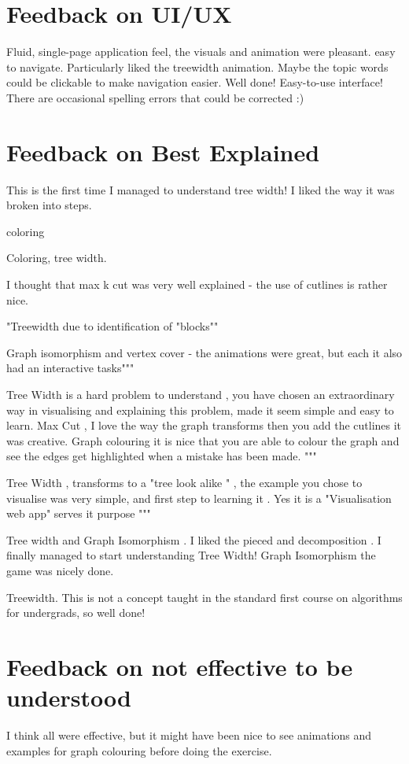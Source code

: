 \section{Feedback on UI/UX}
Fluid, single-page application feel, 
the visuals and animation were pleasant. easy to navigate.
Particularly liked the treewidth animation.
Maybe the topic words could be clickable to make navigation easier.
Well done! Easy-to-use interface! There are occasional spelling errors that
   could be corrected :)



\section{Feedback on Best Explained}
This is the first time I managed to understand tree width! I liked the
way it was broken into steps.

coloring

Coloring, tree width.

I thought that max k cut was very well explained - the use of cutlines is rather nice.

"Treewidth due to identification of "blocks""

Graph isomorphism and vertex cover - the animations were great, but
each it also had an interactive tasks"""

Tree Width is a hard problem to understand , you
have chosen an extraordinary way in visualising and explaining this
problem, made it seem simple and easy to learn. 
Max Cut , I love the way
the graph transforms then you add the cutlines it was creative. Graph
colouring it is nice that you are able to colour the graph and see the
edges get highlighted when a mistake has been made.  """

Tree Width ,
transforms to a "tree look alike " , the example you chose to visualise
was very simple, and first step to learning it . Yes it is a
"Visualisation web app" serves it purpose """

Tree width and Graph Isomorphism . I liked the pieced and decomposition .
I finally managed to start understanding Tree Width!  Graph Isomorphism
the game was nicely done.

Treewidth. This is not a concept taught in the standard first course on
algorithms for undergrads, so well done!

\section{Feedback on not effective to be understood}
I think all were effective, but it might have been nice to see animations 
and examples for graph colouring before doing the exercise.

